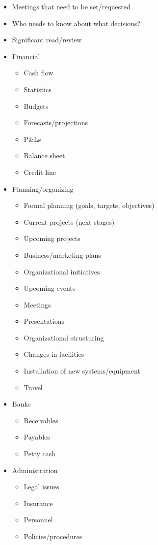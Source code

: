\documentclass[10pt,landscape]{article}
\begin{document}
\begin{multicols}{3}
\begin{itemize}
\begin{itemize}
\end{itemize}

\item Meetings that need to be set/requested 
\item Who needs to know about what decisions? 
\item Significant read/review 
\item Financial \begin{itemize}
\item Cash flow 
\item Statistics 
\item Budgets 
\item Forecasts/projections 
\item P\&Ls 
\item Balance sheet 
\item Credit line 

\end{itemize}

\item Planning/organizing \begin{itemize}
\item Formal planning (goals, targets, objectives) 
\item Current projects (next stages) 
\item Upcoming projects 
\item Business/marketing plans 
\item Organizational initiatives 
\item Upcoming events 
\item Meetings 
\item Presentations 
\item Organizational structuring 
\item Changes in facilities 
\item Installation of new systems/equipment 
\item Travel 

\end{itemize}

\item Banks \begin{itemize}
\item Receivables 
\item Payables 
\item Petty cash 

\end{itemize}

\item Administration \begin{itemize}
\item Legal issues 
\item Insurance 
\item Personnel 
\item Policies/procedures 


\end{itemize}
\end{itemize}
\end{multicols}
\end{document}
